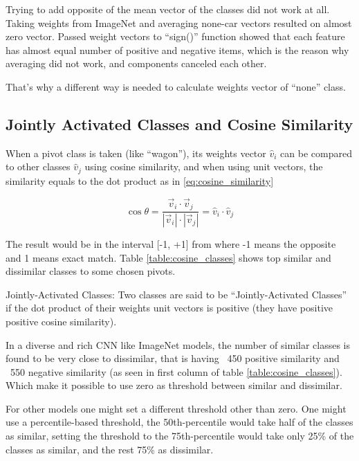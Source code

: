 Trying to add opposite of the mean vector of the classes did not work at all.
Taking weights from ImageNet and averaging none-car vectors resulted on almost zero vector.
Passed weight vectors to ``sign()'' function showed that
each feature has almost equal number of positive and negative items,
which is the reason why averaging did not work, and components canceled each other.

That's why a different way is needed to calculate weights vector of ``none'' class.

\subsection{Jointly Activated Classes and Cosine Similarity}

When a pivot class is taken (like ``wagon''), its weights vector \(\hat{v}_i\)
can be compared to other classes \(\hat{v}_j\) using cosine similarity,
and when using unit vectors, the similarity equals to the dot product as in \ref{eq:cosine_similarity}

\begin{equation}
\cos \theta = \frac{ \vec{v}_{i}\cdot \vec{v}_{j} }{ |\vec{v}_{i}| \cdot |\vec{v}_{j}| } = \hat{v}_{i}\cdot \hat{v}_{j}
\label{eq:cosine_similarity}
\end{equation}

The result would be in the interval [-1, +1] from where -1 means the opposite and 1 means exact match.
Table \ref{table:cosine_classes} shows top similar and dissimilar classes to some chosen pivots.

\begin{definition}{Jointly-Activated Classes:}
Two classes are said to be ``Jointly-Activated Classes'' if the dot product of their weights unit vectors is positive
(they have positive positive cosine similarity).
\label{def:jointly_activated}
\end{definition}

In a diverse and rich CNN like ImageNet models,
the number of similar classes is found to be very close to dissimilar,
that is having ~450 positive similarity and ~550 negative similarity
(as seen in first column of table \ref{table:cosine_classes}).
Which make it possible to use zero as threshold between similar and dissimilar.

For other models one might set a different threshold other than zero.
One might use a percentile-based threshold, the 50th-percentile would take half of the classes as similar,
setting the threshold to the 75th-percentile would take only 25\% of the classes as similar,
and the rest 75\% as dissimilar.


